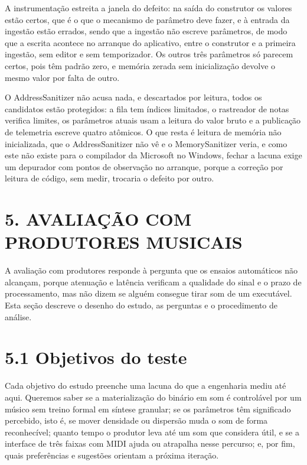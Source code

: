 \documentclass[11pt,a4paper]{article}
\begin{document}
A instrumentação estreita a janela do defeito: na saída do construtor os valores estão certos, que é o que o mecanismo de parâmetro deve fazer, e à entrada da ingestão estão errados, sendo que a ingestão não escreve parâmetros, de modo que a escrita acontece no arranque do aplicativo, entre o construtor e a primeira ingestão, sem editor e sem temporizador. Os outros três parâmetros só parecem certos, pois têm padrão zero, e memória zerada sem inicialização devolve o mesmo valor por falta de outro.


O AddressSanitizer não acusa nada, e descartados por leitura, todos os candidatos estão protegidos: a fila tem índices limitados, o rastreador de notas verifica limites, os parâmetros atuais usam a leitura do valor bruto e a publicação de telemetria escreve quatro atômicos. O que resta é leitura de memória não inicializada, que o AddressSanitizer não vê e o MemorySanitizer veria, e como este não existe para o compilador da Microsoft no Windows, fechar a lacuna exige um depurador com pontos de observação no arranque, porque a correção por leitura de código, sem medir, trocaria o defeito por outro.


\section*{5. AVALIAÇÃO COM PRODUTORES MUSICAIS}

A avaliação com produtores responde à pergunta que os ensaios automáticos não alcançam, porque atenuação e latência verificam a qualidade do sinal e o prazo de processamento, mas não dizem se alguém consegue tirar som de um executável. Esta seção descreve o desenho do estudo, as perguntas e o procedimento de análise.


\section*{5.1 Objetivos do teste}

Cada objetivo do estudo preenche uma lacuna do que a engenharia mediu até aqui. Queremos saber se a materialização do binário em som é controlável por um músico sem treino formal em síntese granular; se os parâmetros têm significado percebido, isto é, se mover densidade ou dispersão muda o som de forma reconhecível; quanto tempo o produtor leva até um som que considera útil, e se a interface de três faixas com MIDI ajuda ou atrapalha nesse percurso; e, por fim, quais preferências e sugestões orientam a próxima iteração.
\end{document}
